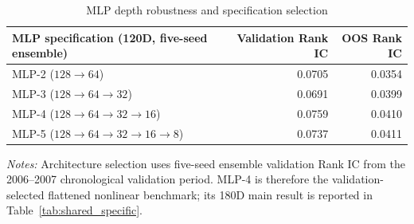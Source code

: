 \begin{table}[htbp]
\centering
\caption{MLP depth robustness and specification selection}
\label{tab:mlp_stability}
\begin{tabular}{lrr}
\toprule
MLP specification (120D, five-seed ensemble) & Validation Rank IC & OOS Rank IC \\
\midrule
MLP-2 ($128\rightarrow64$) & 0.0705 & 0.0354 \\
MLP-3 ($128\rightarrow64\rightarrow32$) & 0.0691 & 0.0399 \\
MLP-4 ($128\rightarrow64\rightarrow32\rightarrow16$) & 0.0759 & 0.0410 \\
MLP-5 ($128\rightarrow64\rightarrow32\rightarrow16\rightarrow8$) & 0.0737 & 0.0411 \\
\bottomrule
\end{tabular}
\begin{minipage}{0.92\linewidth}
\footnotesize
\textit{Notes:} Architecture selection uses five-seed ensemble validation Rank IC from the 2006--2007 chronological validation period. MLP-4 is therefore the validation-selected flattened nonlinear benchmark; its 180D main result is reported in Table~\ref{tab:shared_specific}.
\end{minipage}
\end{table}
